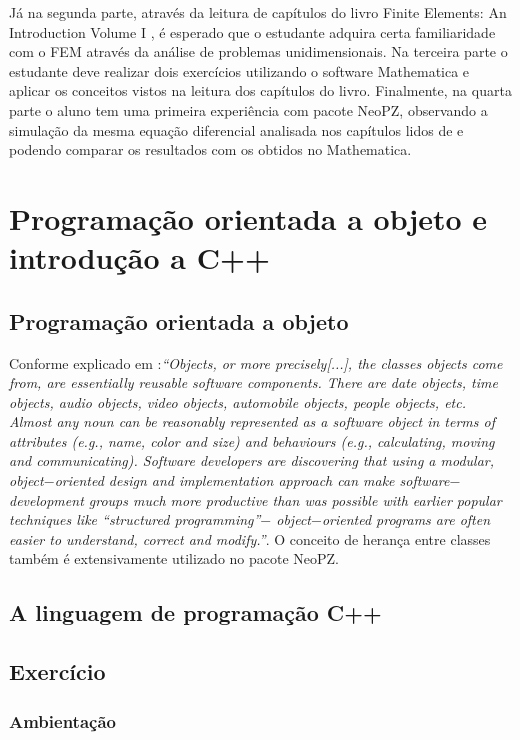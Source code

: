 \documentclass[11pt, oneside]{article}   	%
\begin{document}
Já na segunda parte, através da leitura de capítulos do livro Finite Elements: An Introduction Volume I \citep{oden81}, é esperado que o estudante adquira certa familiaridade com o FEM através da análise de problemas unidimensionais. Na terceira parte o estudante deve realizar dois exercícios utilizando o software Mathematica e aplicar os conceitos vistos na leitura dos capítulos do livro. Finalmente, na quarta parte o aluno tem uma primeira experiência com pacote NeoPZ, observando a simulação da mesma equação diferencial analisada nos capítulos lidos de \citet{oden81} e podendo comparar os resultados com os obtidos no Mathematica. 
\newpage

\section{Programação orientada a objeto e introdução a C++}
\subsection{Programação orientada a objeto}
Conforme explicado em \citet{deitel12}:\emph{``Objects, or more precisely[...], the classes objects come from, are essentially reusable software components. There are date objects, time objects, audio objects, video objects, automobile objects, people objects, etc. Almost any noun can be reasonably represented as a software object in terms of attributes (e.g., name, color and size) and behaviours (e.g., calculating, moving and communicating). Software developers are discovering that using a modular, object$-$oriented design and implementation approach can make software$-$development groups much more productive than was possible with earlier popular techniques like ``structured programming''$-$ object$-$oriented programs are often easier to understand, correct and modify.''}. O conceito de herança entre classes também é extensivamente utilizado no pacote NeoPZ.
\subsection{A linguagem de programação C++}
\subsection{Exercício}
\subsubsection{Ambientação}
\end{document}
